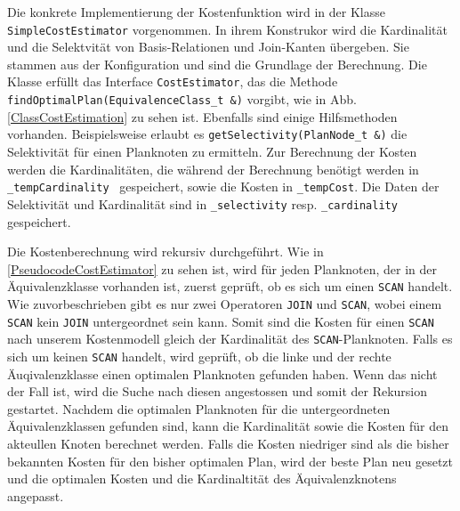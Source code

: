 Die konkrete Implementierung der Kostenfunktion wird in der Klasse \texttt{Simple\-Cost\-Estimator} vorgenommen. In ihrem Konstrukor wird die Kardinalität und die Selektvität von Basis-Relationen und Join-Kanten übergeben. Sie stammen aus der Konfiguration und sind die Grundlage der Berechnung. Die Klasse erfüllt das Interface \texttt{Cost\-Estimator}, das die Methode \texttt{find\-Optimal\-Plan(Equivalence\-Class\_t \&)} vorgibt, wie in Abb. \ref{ClassCostEstimation} zu sehen ist. Ebenfalls sind einige Hilfsmethoden vorhanden. Beispielsweise erlaubt es \texttt{get\-Selectivity(Plan\-Node\_t \&)} die Selektivität für einen Planknoten zu ermitteln. Zur Berechnung der Kosten werden die Kardinalitäten, die während der Berechnung benötigt werden in \texttt{\_temp\-Cardinality } gespeichert, sowie die Kosten in \texttt{\_temp\-Cost}. Die Daten der Selektivität und Kardinalität sind in \texttt{\_selectivity} resp. \texttt{\_cardinality} gespeichert.


Die Kostenberechnung wird rekursiv durchgeführt. Wie in \ref{PseudocodeCostEstimator} zu sehen ist, wird für jeden Planknoten, der in der Äquivalenzklasse vorhanden ist, zuerst geprüft, ob es sich um einen \texttt{SCAN} handelt. Wie zuvorbeschrieben gibt es nur zwei Operatoren \texttt{JOIN} und \texttt{SCAN}, wobei einem \texttt{SCAN} kein \texttt{JOIN} untergeordnet sein kann. Somit sind die Kosten für einen \texttt{SCAN} nach unserem Kostenmodell gleich der Kardinalität des \texttt{SCAN}-Planknoten. Falls es sich um keinen \texttt{SCAN} handelt, wird geprüft, ob die linke und der rechte Äuqivalenzklasse einen optimalen Planknoten gefunden haben. Wenn das nicht der Fall ist, wird die Suche nach diesen angestossen und somit der Rekursion gestartet. Nachdem die optimalen Planknoten für die untergeordneten Äquivalenzklassen gefunden sind, kann die Kardinalität sowie die Kosten für den akteullen Knoten berechnet werden. Falls die Kosten niedriger sind als die bisher bekannten Kosten für den bisher optimalen Plan, wird der beste Plan neu gesetzt und die optimalen Kosten und die Kardinaltität des Äquivalenzknotens angepasst.



